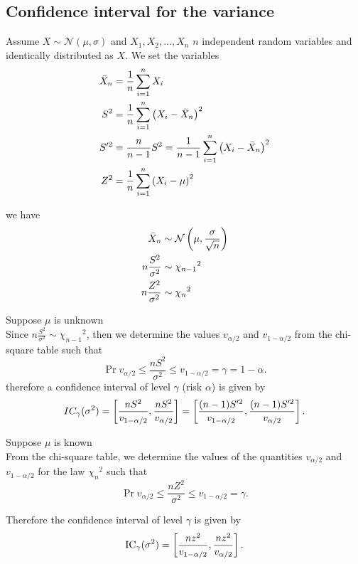 \documentclass{report}
\begin{document}
\subsection{Confidence interval for the variance}
Assume $X\sim\mathcal{N}(\mu,\sigma)$ and $X_1,X_2,\dots,X_n$ $n$ independent random variables and identically distributed as $X$. We set the variables
\begin{align*}
	\bar{X}_n & = \frac{1}{n}\sum_{i=1}^nX_i                                          \\
	S^2       & = \frac{1}{n}\sum_{i=1}^n\left(X_i-\bar{X}_n\right)^2                      \\
	S'^2      & = \frac{n}{n-1}S^2 = \frac{1}{n-1}\sum_{i=1}^n\left(X_i-\bar{X}_n\right)^2 \\
	Z^2       & =  \frac{1}{n}\sum_{i=1}^n\left(X_i-\mu\right)^2                           \\
\end{align*}

we have
\begin{align*}
	\bar{X}_n             & \sim\mathcal{N}\left(\mu,\frac{\sigma}{\sqrt{n}}\right) \\
	n\frac{S^2}{\sigma^2} & \sim{\chi_{n-1}}^2                                 \\
	n\frac{Z^2}{\sigma^2} & \sim{\chi_n}^2                                     \\
\end{align*}

\begin{enumerate}
	\ii Suppose $\mu$ is unknown\\

	Since $n\frac{S^2}{\sigma^2}\sim{\chi_{n-1}}^2$, then we determine the values $v_{\alpha/2}$ and $v_{1-\alpha/2}$ from the chi-square table such that
	\[
		\Pr{v_{\alpha/2}\leq \frac{nS^2}{\sigma^2}\leq v_{1-\alpha/2}} = \gamma=1-\alpha
		.\]
	therefore a confidence interval of level $\gamma$ (risk $\alpha$) is given by
	\[
		IC_\gamma(\sigma^2)=\left[\frac{nS^2}{v_{1-\alpha/2}}, \frac{nS^2}{v_{\alpha/2}} \right] = \left[\frac{(n-1)S'^2}{v_{1-\alpha/2}}, \frac{(n-1)S'^2}{v_{\alpha/2}} \right]
		.\]

	\ii Suppose $\mu$ is known\\

	From the chi-square table, we determine the values of the quantities $v_{\alpha/2}$ and $v_{1-\alpha/2}$ for the law ${\chi_n}^2$ such that
	\[
		\Pr{v_{\alpha/2}\leq \frac{nZ^2}{\sigma^2}\leq v_{1-\alpha/2}}=\gamma
		.\]

	Therefore the confidence interval of level $\gamma$ is given by
	\[
		\mathrm{IC}_\gamma(\sigma^2)=\left[\frac{nz^2}{v_{1-\alpha/2}},\frac{nz^2}{v_{\alpha/2}}\right]
		.\]

\end{enumerate}
\end{document}
